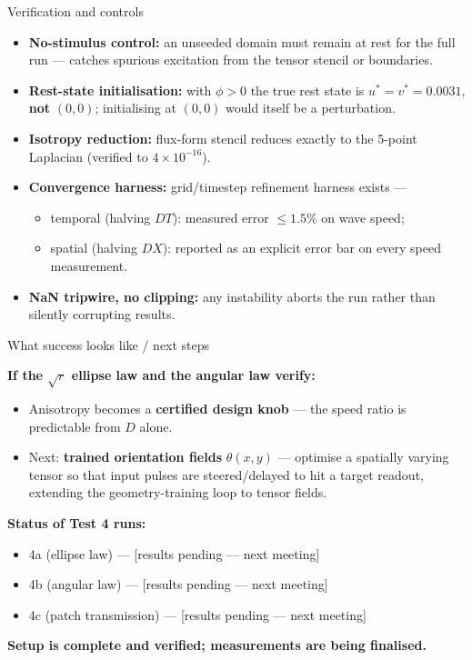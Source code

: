 \documentclass[aspectratio=169,11pt]{beamer}
\begin{document}
\begin{frame}{Verification and controls}

\begin{itemize}
    \item \textbf{No-stimulus control:} an unseeded domain must remain at rest for the full run --- catches spurious excitation from the tensor stencil or boundaries.
    \item \textbf{Rest-state initialisation:} with $\phi > 0$ the true rest state is $u^* = v^* = 0.0031$, \textbf{not} $(0,0)$; initialising at $(0,0)$ would itself be a perturbation.
    \item \textbf{Isotropy reduction:} flux-form stencil reduces exactly to the 5-point Laplacian (verified to $4\times10^{-16}$).
    \item \textbf{Convergence harness:} grid/timestep refinement harness exists ---
    \begin{itemize}
        \item temporal (halving $DT$): measured error $\le 1.5\%$ on wave speed;
        \item spatial (halving $DX$): reported as an explicit error bar on every speed measurement.
    \end{itemize}
    \item \textbf{NaN tripwire, no clipping:} any instability aborts the run rather than silently corrupting results.
\end{itemize}

\end{frame}

\begin{frame}{What success looks like / next steps}

\textbf{If the $\sqrt{r}$ ellipse law and the angular law verify:}
\begin{itemize}
    \item Anisotropy becomes a \textbf{certified design knob} --- the speed ratio is predictable from $D$ alone.
    \item Next: \textbf{trained orientation fields} $\theta(x,y)$ --- optimise a spatially varying tensor so that input pulses are steered/delayed to hit a target readout, extending the geometry-training loop to tensor fields.
\end{itemize}

\vspace{0.4cm}
\textbf{Status of Test 4 runs:}
\begin{itemize}
    \item 4a (ellipse law) --- [results pending --- next meeting]
    \item 4b (angular law) --- [results pending --- next meeting]
    \item 4c (patch transmission) --- [results pending --- next meeting]
\end{itemize}

\vspace{0.3cm}
\centering
\textbf{Setup is complete and verified; measurements are being finalised.}

\end{frame}
\end{document}
